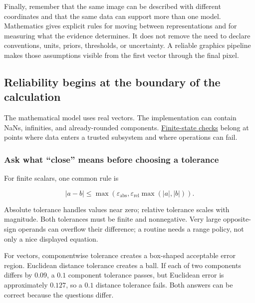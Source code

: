 Finally, remember that the same image can be described with different coordinates and that the same data can support more than one model. Mathematics gives explicit rules for moving between representations and for measuring what the evidence determines. It does not remove the need to declare conventions, units, priors, thresholds, or uncertainty. A reliable graphics pipeline makes those assumptions visible from the first vector through the final pixel.

\subsection{Reliability begins at the boundary of the calculation}\label{02-foundations-ii-ch037-reliability-begins-at-the-boundary-of-the-calculation}

\hypertarget{02-foundations-ii-ch037-reliability-begins-at-the-boundary-of-the-calculation}{}

The mathematical model uses real vectors. The implementation can contain NaNs, infinities, and already-rounded components. \hyperref[02-foundations-ii-ch037-reliability-begins-at-the-boundary-of-the-calculation]{Finite-state checks} belong at points where data enters a trusted subsystem and where operations can fail.

\subsubsection{Ask what ``close'' means before choosing a tolerance}\label{02-foundations-ii-ch037-ask-what-close-means-before-choosing-a-tolerance}

\hypertarget{02-foundations-ii-ch037-ask-what-close-means-before-choosing-a-tolerance}{}

For finite scalars, one common rule is

\[
|a-b|\le\max\left(\varepsilon_{\mathrm{abs}},
\varepsilon_{\mathrm{rel}}\max(|a|,|b|)\right).
\]

Absolute tolerance handles values near zero; relative tolerance scales with magnitude. Both tolerances must be finite and nonnegative. Very large opposite-sign operands can overflow their difference; a routine needs a range policy, not only a nice displayed equation.

For vectors, componentwise tolerance creates a box-shaped acceptable error region. Euclidean distance tolerance creates a ball. If each of two components differs by \(0.09\), a \(0.1\) component tolerance passes, but Euclidean error is approximately \(0.127\), so a \(0.1\) distance tolerance fails. Both answers can be correct because the questions differ.

